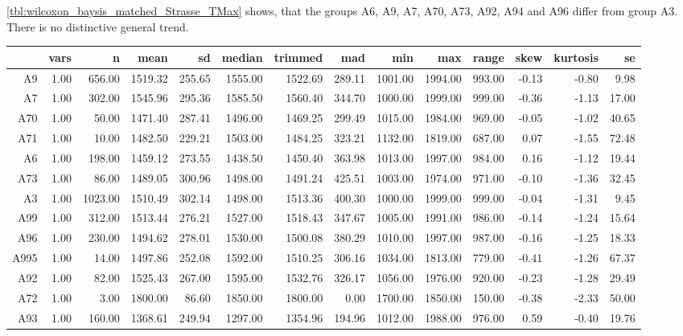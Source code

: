 \cref{tbl:wilcoxon_baysis_matched_Strasse_TMax} shows, that the groups A6, A9, A7, A70, A73, A92, A94 and A96 differ from group A3. There is no distinctive general trend.
\begin{table}[ht!]
	\tiny
	\centering
  \begin{tabular}{rrrrrrrrrrrrrr}
    \hline
    & vars & n & mean & sd & median & trimmed & mad & min & max & range & skew & kurtosis & se \\ 
    \hline
    A9   & 1.00 & 656.00 & 1519.32 & 255.65 & 1555.00 & 1522.69 & 289.11 & 1001.00 & 1994.00 & 993.00 & -0.13 & -0.80 & 9.98 \\ 
    A7   & 1.00 & 302.00 & 1545.96 & 295.36 & 1585.50 & 1560.40 & 344.70 & 1000.00 & 1999.00 & 999.00 & -0.36 & -1.13 & 17.00 \\ 
    A70  & 1.00 & 50.00 & 1471.40 & 287.41 & 1496.00 & 1469.25 & 299.49 & 1015.00 & 1984.00 & 969.00 & -0.05 & -1.02 & 40.65 \\ 
    A71  & 1.00 & 10.00 & 1482.50 & 229.21 & 1503.00 & 1484.25 & 323.21 & 1132.00 & 1819.00 & 687.00 & 0.07 & -1.55 & 72.48 \\ 
    A6   & 1.00 & 198.00 & 1459.12 & 273.55 & 1438.50 & 1450.40 & 363.98 & 1013.00 & 1997.00 & 984.00 & 0.16 & -1.12 & 19.44 \\ 
    A73  & 1.00 & 86.00 & 1489.05 & 300.96 & 1498.00 & 1491.24 & 425.51 & 1003.00 & 1974.00 & 971.00 & -0.10 & -1.36 & 32.45 \\ 
    A3   & 1.00 & 1023.00 & 1510.49 & 302.14 & 1498.00 & 1513.36 & 400.30 & 1000.00 & 1999.00 & 999.00 & -0.04 & -1.31 & 9.45 \\ 
    A99  & 1.00 & 312.00 & 1513.44 & 276.21 & 1527.00 & 1518.43 & 347.67 & 1005.00 & 1991.00 & 986.00 & -0.14 & -1.24 & 15.64 \\ 
    A96  & 1.00 & 230.00 & 1494.62 & 278.01 & 1530.00 & 1500.08 & 380.29 & 1010.00 & 1997.00 & 987.00 & -0.16 & -1.25 & 18.33 \\ 
    A995 & 1.00 & 14.00 & 1497.86 & 252.08 & 1592.00 & 1510.25 & 306.16 & 1034.00 & 1813.00 & 779.00 & -0.41 & -1.26 & 67.37 \\ 
    A92  & 1.00 & 82.00 & 1525.43 & 267.00 & 1595.00 & 1532.76 & 326.17 & 1056.00 & 1976.00 & 920.00 & -0.23 & -1.28 & 29.49 \\ 
    A72  & 1.00 & 3.00 & 1800.00 & 86.60 & 1850.00 & 1800.00 & 0.00 & 1700.00 & 1850.00 & 150.00 & -0.38 & -2.33 & 50.00 \\ 
    A93  & 1.00 & 160.00 & 1368.61 & 249.94 & 1297.00 & 1354.96 & 194.96 & 1012.00 & 1988.00 & 976.00 & 0.59 & -0.40 & 19.76 \\ 

\end{tabular}
\end{table}
